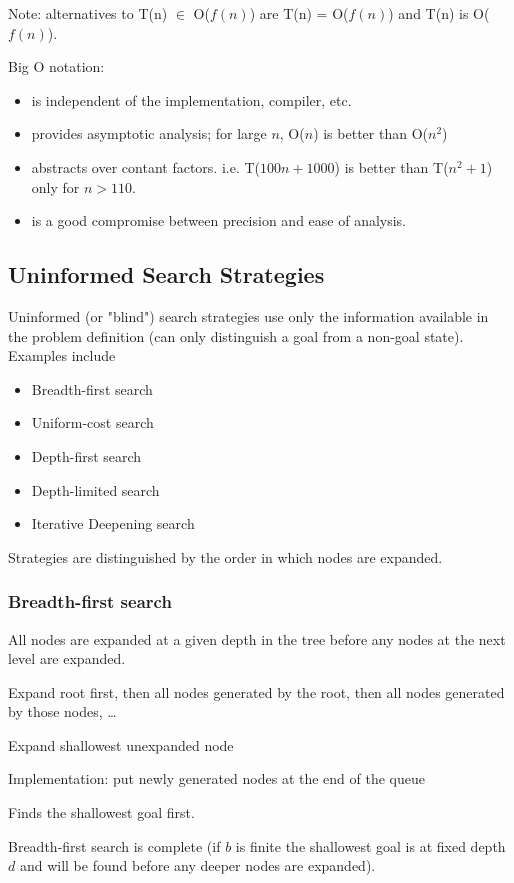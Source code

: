 Note: alternatives to T(n) $\in$ O($f(n)$) are T(n) = O($f(n)$) and T(n) is
O($f(n)$).

Big O notation:
\begin{itemize}
    \item is independent of the implementation, compiler, etc.
    \item provides asymptotic analysis; for large $n$, O($n$) is better than O($n^2$)
    \item abstracts over contant factors. i.e. T($100n + 1000$) is better than
    T($n^2 + 1$) only for $n > 110$.
    \item is a good compromise between precision and ease of analysis.
\end{itemize}

\subsection{Uninformed Search Strategies}
Uninformed (or "blind") search strategies use only the information available in
the problem definition (can only distinguish a goal from a non-goal state).
Examples include
\begin{itemize}
    \item Breadth-first search
    \item Uniform-cost search
    \item Depth-first search
    \item Depth-limited search
    \item Iterative Deepening search
\end{itemize}
Strategies are distinguished by the order in which nodes are expanded.

\subsubsection{Breadth-first search}
All nodes are expanded at a given depth in the tree before any nodes at the
next level are expanded.

Expand root first, then all nodes generated by the root, then all nodes
generated by those nodes, \ldots

Expand shallowest unexpanded node

Implementation: put newly generated nodes at the end of the queue

Finds the shallowest goal first.

Breadth-first search is complete (if $b$ is finite the shallowest goal is at
fixed depth $d$ and will be found before any deeper nodes are expanded).

